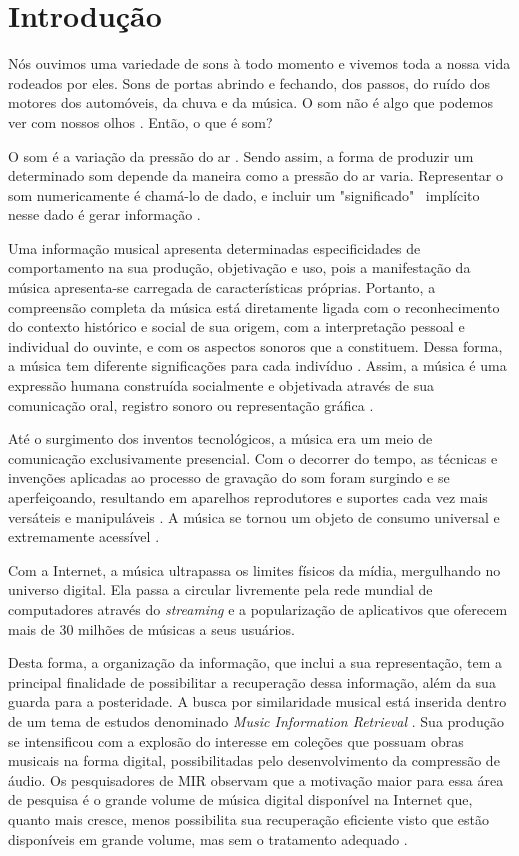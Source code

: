 \chapter{Introdução}
Nós ouvimos uma variedade de sons à todo momento e vivemos toda a nossa vida rodeados por eles. Sons de portas abrindo e fechando, dos passos, do ruído dos motores dos automóveis, da chuva e da música. O som não é algo que podemos ver com nossos olhos \cite{miletto2004}. Então, o que é som?

O som é a variação da pressão do ar \cite{muller2007}. Sendo assim, a forma de produzir um determinado som depende da maneira como a pressão do ar varia. Representar o som numericamente é chamá-lo de dado, e incluir um "significado" \ implícito nesse dado é gerar informação \cite{miletto2004}.

Uma informação musical apresenta determinadas especificidades de comportamento na sua produção, objetivação e uso, pois a manifestação da música apresenta-se carregada de características próprias. Portanto, a compreensão completa da música está diretamente ligada com o reconhecimento do contexto histórico e social de sua origem, com a interpretação pessoal e individual do ouvinte, e com os aspectos sonoros que a constituem. Dessa forma, a música tem diferente significações para cada indivíduo \cite{michels1992}. Assim, a música é uma expressão humana construída socialmente e objetivada através de sua comunicação oral, registro sonoro ou representação gráfica \cite{barros2012}.

Até o surgimento dos inventos tecnológicos, a música era um meio de comunicação exclusivamente presencial. Com o decorrer do tempo, as técnicas e invenções aplicadas ao processo de gravação do som foram surgindo e se aperfeiçoando, resultando em aparelhos reprodutores e suportes cada vez mais versáteis e manipuláveis \cite{daquino2012}. A música se tornou um objeto de consumo universal e extremamente acessível \cite{gomes2015}.

Com a Internet, a música ultrapassa os limites físicos da mídia, mergulhando no universo digital. Ela passa a circular livremente pela rede mundial de computadores através do \textit{streaming} \cite{junior&segundo2008} e a popularização de aplicativos que oferecem mais de 30 milhões de músicas a seus usuários.

Desta forma, a organização da informação, que inclui a sua representação, tem a principal finalidade de possibilitar a recuperação dessa informação, além da sua guarda para a posteridade. A busca por similaridade musical está inserida dentro de um tema de estudos denominado \textit{Music Information Retrieval} \cite{mclane1996}. Sua produção se intensificou com a explosão do interesse em coleções que possuam obras musicais na forma digital, possibilitadas pelo desenvolvimento da compressão de áudio. Os pesquisadores de MIR observam que a motivação maior para essa área de pesquisa é o grande volume de música digital disponível na Internet que, quanto mais cresce, menos possibilita sua recuperação eficiente visto que estão disponíveis em grande volume, mas sem o tratamento adequado \cite{gomes2015}.

